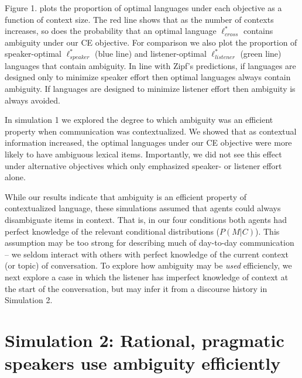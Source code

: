 \documentclass[10pt, letterpaper]{article}
\begin{document}
Figure 1. plots the proportion of optimal languages under each objective
as a function of context size. The red line shows that as the number of
contexts increases, so does the probability that an optimal language
\(\ell^*_{cross}\) contains ambiguity under our CE objective. For
comparison we also plot the proportion of speaker-optimal
\(\ell^*_{speaker}\) (blue line) and listener-optimal
\(\ell^*_{listener}\) (green line) languages that contain ambiguity. In
line with Zipf's predictions, if languages are designed only to minimize
speaker effort then optimal languages always contain ambiguity. If
languages are designed to minimize listener effort then ambiguity is
always avoided.\par

In simulation 1 we explored the degree to which ambiguity was an
efficient property when communication was contextualized. We showed that
as contextual information increased, the optimal languages under our CE
objective were more likely to have ambiguous lexical items. Importantly,
we did not see this effect under alternative objectives which only
emphasized speaker- or listener effort alone.\par

While our results indicate that ambiguity is an efficient property of
contextualized language, these simulations assumed that agents could
always disambiguate items in context. That is, in our four conditions
both agents had perfect knowledge of the relevant conditional
distributions (\(P(M|C)\)). This assumption may be too strong for
describing much of day-to-day communication -- we seldom interact with
others with perfect knowledge of the current context (or topic) of
conversation. To explore how ambiguity may be \textit{used} efficiencly,
we next explore a case in which the listener has imperfect knowledge of
context at the start of the conversation, but may infer it from a
discourse history in Simulation 2.\par

\section{Simulation 2: Rational, pragmatic speakers use ambiguity
efficiently}\label{simulation-2-rational-pragmatic-speakers-use-ambiguity-efficiently}
\end{document}
